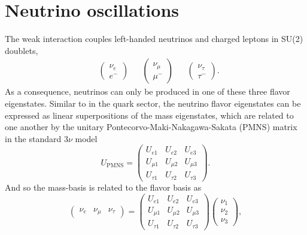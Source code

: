 \documentclass[main.tex]{subfiles}
\begin{document}
\section{Neutrino oscillations}

The weak interaction couples left-handed neutrinos and charged leptons in SU(2) doublets,
\begin{align}
&\left(\begin{array}{c} \nu_{e} \\ e^{-} \end{array}\right) & &\left(\begin{array}{c} \nu_{\mu} \\ \mu^{-} \end{array}\right) & &\left(\begin{array}{c} \nu_{\tau} \\ \tau^{-} \end{array}\right).
\end{align}
As a consequence, neutrinos can only be produced in one of these three flavor eigenstates.
Similar to in the quark sector, the neutrino flavor eigenstates can be expressed as linear superpositions of the mass eigenstates, which are related to one another by the unitary Pontecorvo-Maki-Nakagawa-Sakata (PMNS) matrix in the standard $3\nu$ model
\begin{equation}
    U_{\text{PMNS}} = \left(\begin{array}{ccc} U_{e1} & U_{e2} & U_{e3} \\ U_{\mu 1} & U_{\mu 2} & U_{\mu 3} \\ U_{\tau 1} & U_{\tau 2} & U_{\tau 3} \end{array}\right).
\end{equation}
And so the mass-basis is related to the flavor basis as
\begin{equation}
    \left(\begin{array}{ccc} \nu_{e} & \nu_{\mu} & \nu_{\tau} \end{array}\right)  = \left(\begin{array}{ccc} U_{e1} & U_{e2} & U_{e3} \\ U_{\mu 1} & U_{\mu 2} & U_{\mu 3} \\ U_{\tau 1} & U_{\tau 2} & U_{\tau 3} \end{array}\right) \left(\begin{array}{c} \nu_{1} \\ \nu_{2} \\ \nu_{3} \end{array}\right),
\end{equation}
\end{document}
